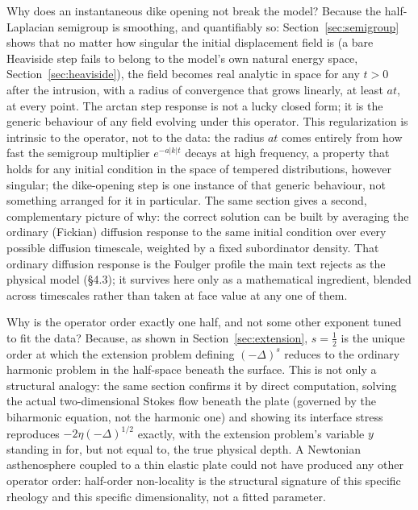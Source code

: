 \documentclass{article}
\begin{document}
Why does an instantaneous dike opening not break the model? Because the
half-Laplacian semigroup is smoothing, and quantifiably so:
Section~\ref{sec:semigroup} shows that no matter how singular the initial
displacement field is (a bare Heaviside step fails to belong to the
model's own natural energy space, Section~\ref{sec:heaviside}), the field
becomes real analytic in space for any $t>0$ after the intrusion, with a
radius of convergence that grows linearly, at least $at$, at every point.
The arctan step response is not a lucky closed form; it is the generic
behaviour of any field evolving under this operator. This regularization is
intrinsic to the operator, not to the data: the radius $at$ comes entirely
from how fast the semigroup multiplier $e^{-a|k|t}$ decays at high
frequency, a property that holds for any initial condition in the space of
tempered distributions, however singular; the dike-opening step is one
instance of that generic behaviour, not something arranged for it in
particular. The same section gives a second, complementary picture of why:
the correct solution can be
built by averaging the ordinary (Fickian) diffusion response to the same
initial condition over every possible diffusion timescale, weighted by a
fixed subordinator density. That ordinary diffusion response is the Foulger
profile the main text rejects as the physical model (§4.3); it
survives here only as a mathematical ingredient, blended across timescales
rather than taken at face value at any one of them.

Why is the operator order exactly one half, and not some other exponent
tuned to fit the data? Because, as shown in Section~\ref{sec:extension},
$s=\tfrac12$ is the unique order at which the extension problem defining
$(-\Delta)^s$ reduces to the ordinary harmonic problem in the half-space
beneath the surface. This is not only a structural analogy: the same
section confirms it by direct computation, solving the actual
two-dimensional Stokes flow beneath the plate (governed by the biharmonic
equation, not the harmonic one) and showing its interface stress
reproduces $-2\eta(-\Delta)^{1/2}$ exactly, with the extension problem's
variable $y$ standing in for, but not equal to, the true physical depth.
A Newtonian asthenosphere coupled to a thin elastic plate could not have
produced any other operator order: half-order non-locality is the
structural signature of this specific rheology and this specific
dimensionality, not a fitted parameter.
\end{document}
